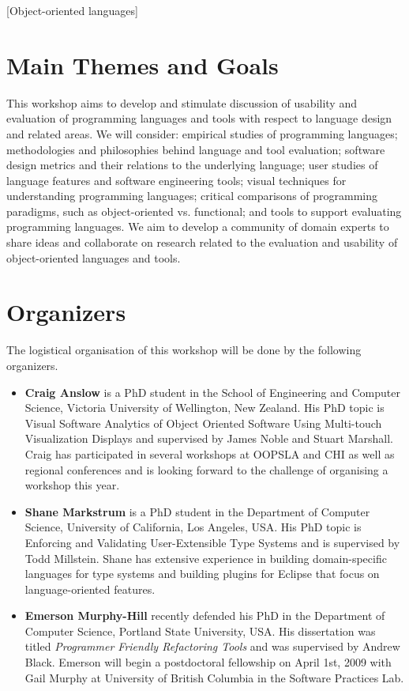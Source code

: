 \documentclass{acm_proc_article-sp}
\begin{document}
[Object-oriented languages]



\section{Main Themes and Goals}

This workshop aims to develop and stimulate discussion of usability
and evaluation of programming languages and tools with respect to
language design and related areas.  We will consider: empirical
studies of programming languages; methodologies and philosophies
behind language and tool evaluation; software design metrics and their
relations to the underlying language; user studies of language
features and software engineering tools; visual techniques for
understanding programming languages; critical comparisons of
programming paradigms, such as object-oriented vs. functional; and
tools to support evaluating programming languages.  We aim to develop
a community of domain experts to share ideas and collaborate on
research related to the evaluation and usability of object-oriented
languages and tools.

\section{Organizers}

The logistical organisation of this workshop will be done by the following organizers.

\begin{itemize}
\item \textbf{Craig Anslow} is a PhD student in the School of
Engineering and Computer Science, Victoria University of Wellington,
New Zealand. His PhD topic is Visual Software Analytics of Object
Oriented Software Using Multi-touch Visualization Displays and
supervised by James Noble and Stuart Marshall. Craig has participated
in several workshops at OOPSLA and CHI as well as regional conferences
and is looking forward to the challenge of organising a workshop this
year.

\item \textbf{Shane Markstrum} is a PhD student in the Department of
Computer Science, University of California, Los Angeles, USA. His PhD
topic is Enforcing and Validating User-Extensible Type Systems and is
supervised by Todd Millstein. Shane has extensive experience in
building domain-specific languages for type systems and building
plugins for Eclipse that focus on language-oriented features.

\item \textbf{Emerson Murphy-Hill} recently defended his PhD in the
Department of Computer Science, Portland State University, USA. His
dissertation was titled \emph{Programmer Friendly Refactoring Tools} and was supervised by
Andrew Black. Emerson will begin a postdoctoral fellowship on April 1st, 2009 with Gail Murphy at
University of British Columbia in the Software Practices Lab.
\end{itemize}
\end{document}
